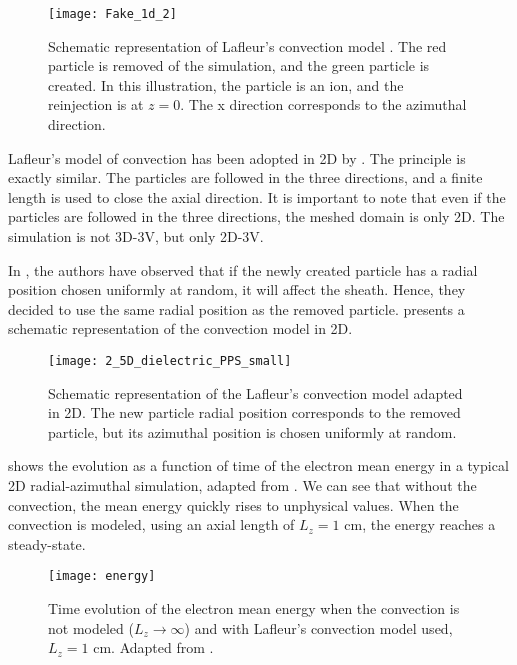    \begin{figure}[hbt]
      \centering
      \texttt{[image: Fake\_1d\_2]}
      \caption{Schematic representation of Lafleur's convection model \citep{lafleur2016a}. The red particle is removed of the simulation, and the green particle is created. In this illustration, the particle is an ion, and the reinjection is at $z=0$. The x direction corresponds to the azimuthal direction.}
      \label{fig-Fake_1d_1}
    \end{figure}

    Lafleur's model of convection has been adopted in \ac{2D} by \citet{croes2017a}.
    The principle is exactly similar.
    The particles are followed in the three directions, and a finite length is used to close the axial direction.
    It is important to note that even if the particles are followed in the three directions, the meshed domain is only \ac{2D}.
    The simulation is not \ac{3D}-\ac{3V}, but only \ac{2D}-\ac{3V}.

    In \citet{croes2017a}, the authors have observed that if the newly created particle has a radial position chosen uniformly at random, it will affect the sheath.
    Hence, they decided to use the same radial position as the removed particle.
     presents a schematic representation of the convection model in \ac{2D}.

    \begin{figure}[hbt]
      \centering
      \texttt{[image: 2\_5D\_dielectric\_PPS\_small]}
      \caption{Schematic representation of the Lafleur's convection model adapted in \acs{2D}. The new particle radial position corresponds to the removed particle, but its azimuthal position is chosen uniformly at random. }
      \label{fig-Fake_2d}
    \end{figure}

     shows the evolution as a function of time of the electron mean energy in a typical \ac{2D} radial-azimuthal simulation, adapted from \citet{croes2017}.
    We can see that without the convection, the mean energy quickly rises to unphysical values.
    When the convection is modeled, using an axial length of $L_z=1$ cm, the energy reaches a steady-state.
    \begin{figure}[hbt]
      \centering
      \texttt{[image: energy]}
      \caption{Time evolution of the electron mean energy when the convection is not modeled ($L_z \rightarrow \infty$) and with Lafleur's convection model used, $L_z = 1$ cm. Adapted from \citet{croes2017}.}
      \label{fig-energy_convection}
    \end{figure}



